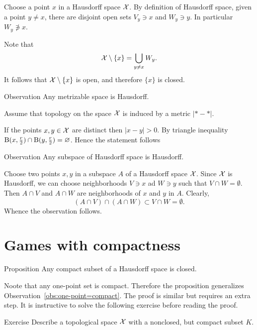 Choose a point $x$ in a Hausdorff space $\mathcal{X}$.
By definition of Hausdorff space, given a point $y\ne x$,
there are disjoint open sets $V_y\ni x$ and $W_y\ni y$.
In particular $W_y\not\ni x$.

Note that 
\[\mathcal{X}\setminus\{x\}=\bigcup_{y\ne x}W_y.\]
It follows that $\mathcal{X}\setminus\{x\}$ is open, and therefore $\{x\}$ is closed.
\qeds

\begin{thm}{Observation}
Any metrizable space is Hausdorff.
\end{thm}

Assume that topology on the space $\mathcal{X}$ is induced by a metric $|{*}-{*}|$.

If the points $x,y\in\mathcal{X}$ are distinct then $|x-y|>0$.
By triangle inequality 
$\mathrm{B}(x,\tfrac r2)\cap \mathrm{B}(y,\tfrac r2)=\varnothing$.
Hence the statement follows
\qeds


\begin{thm}{Observation}
Any subspace of Hausdorff space is Hausdorff.
\end{thm}

Choose two points $x,y$ in a subspace $A$ of a Hausdorff space $\mathcal{X}$.
Since $\mathcal{X}$ is Hausdorff, we can choose neighborhoods $V\ni x$ ad $W\ni y$ such that $V\cap W=\emptyset$.
Then $A\cap V$ and $A\cap W$ are neighborhoods of $x$ and $y$ in $A$.
Clearly, 
\[(A\cap V)\cap(A\cap W)\subset V\cap W=\emptyset.\]
Whence the observation follows.
\qeds


\section{Games with compactness}

\begin{thm}{Proposition}\label{prop:hausdorff-compact-closed}
Any compact  subset of a Hausdorff space is closed. 
\end{thm}

Noote that any one-point set is compact.
Therefore the proposition generalizes Observation~\ref{obs:one-point=compact}.
The proof is similar but requires an extra step.
It is instructive to solve the following exercise before reading the proof.

\begin{thm}{Exercise}\label{ex:nonclosed-compact}
Describe a topological space $\mathcal{X}$ with a nonclosed, but compact subset $K$. 
\end{thm}

